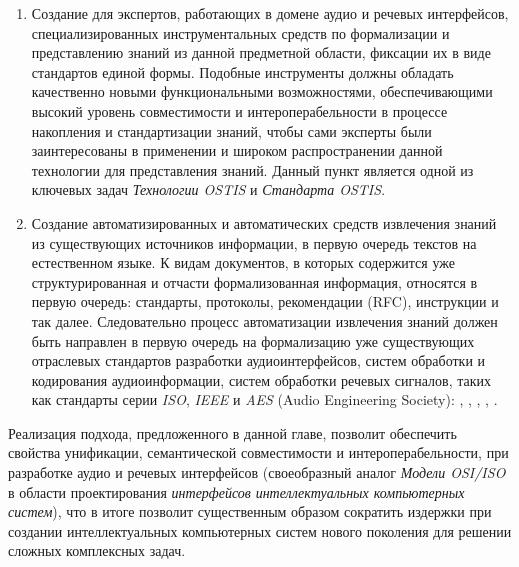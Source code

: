 \begin{enumerate}
  \item Создание для экспертов, работающих в домене аудио и речевых интерфейсов, специализированных инструментальных средств по формализации и представлению знаний из данной предметной области, фиксации их в виде стандартов единой формы. Подобные инструменты должны обладать качественно новыми функциональными возможностями, обеспечивающими высокий уровень совместимости и интероперабельности в процессе накопления и стандартизации знаний, чтобы сами эксперты были заинтересованы в применении и широком распространении данной технологии для представления знаний. Данный пункт является одной из ключевых задач \textit{Технологии OSTIS} и \textit{Стандарта OSTIS}.
  \item Создание автоматизированных и автоматических средств извлечения знаний из существующих источников информации, в первую очередь текстов на естественном языке. К видам документов, в которых содержится уже структурированная и отчасти формализованная информация, относятся в первую очередь: стандарты, протоколы, рекомендации (RFC), инструкции и так далее. Следовательно процесс автоматизации извлечения знаний должен быть направлен в первую очередь на формализацию уже существующих отраслевых стандартов разработки аудиоинтерфейсов, систем обработки и кодирования аудиоинформации, систем обработки речевых сигналов, таких как стандарты серии \textit{ISO}, \textit{IEEE} и \textit{AES} (Audio Engineering Society): , , , , .
\end{enumerate}

Реализация подхода, предложенного в данной главе, позволит обеспечить свойства унификации, семантической совместимости и интероперабельности, при разработке аудио и речевых интерфейсов (своеобразный аналог \textit{Модели OSI/ISO} в области проектирования \textit{интерфейсов} \textit{интеллектуальных компьютерных систем}), что в итоге позволит существенным образом сократить издержки при создании интеллектуальных компьютерных систем нового поколения для решении сложных комплексных задач.


%